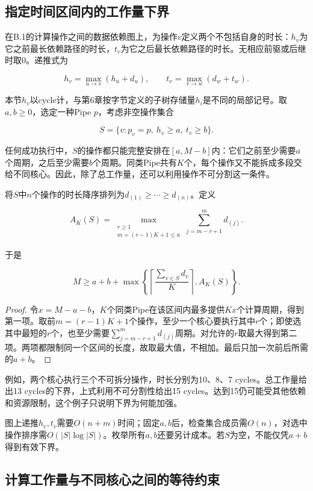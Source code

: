 \documentclass[anonymous,notoc]{gmcm2026}
\begin{document}
\subsection{指定时间区间内的工作量下界}

在B.1的计算操作之间的数据依赖图上，为操作\(v\)定义两个不包括自身的时长：\(h_v\)为它之前最长依赖路径的时长，\(t_v\)为它之后最长依赖路径的时长。无相应前驱或后继时取0。递推式为

\[h_v=\max_{u\to v}(h_u+d_u),\qquad t_v=\max_{v\to w}(d_w+t_w).\]

本节\(h_v\)以cycle计，与第6章按字节定义的子树存储量\(h_i\)是不同的局部记号。取\(a,b\ge0\)，选定一种Pipe \(p\)，考虑非空操作集合

\[S=\{v:p_v=p,\ h_v\ge a,\ t_v\ge b\}.\]

任何成功执行中，\(S\)的操作都只能完整安排在\([a,M-b]\)内：它们之前至少需要\(a\)个周期，之后至少需要\(b\)个周期。同类Pipe共有\(K\)个，每个操作又不能拆成多段交给不同核心。因此，除了总工作量，还可以利用操作不可分割这一条件。

将\(S\)中\(n\)个操作的时长降序排列为\(d_{(1)}\ge\cdots\ge d_{(n)}\)。定义

\[A_K(S)=\max_{\substack{r\ge1\\m=(r-1)K+1\le n}}\sum_{j=m-r+1}^{m}d_{(j)}.\]

于是

\[M\ge a+b+\max\left\{\left\lceil\frac{\sum_{v\in S}d_v}{K}\right\rceil,A_K(S)\right\}.\]

\begin{proof} 令\(x=M-a-b\)，\(K\)个同类Pipe在该区间内最多提供\(Kx\)个计算周期，得到第一项。取前\(m=(r-1)K+1\)个操作，至少一个核心要执行其中\(r\)个；即使选其中最短的\(r\)个，也至少需要\(\sum_{j=m-r+1}^{m}d_{(j)}\)周期。对允许的\(r\)取最大得到第二项。两项都限制同一个区间的长度，故取最大值，不相加。最后只加一次前后所需的\(a+b\)。\end{proof}

例如，两个核心执行三个不可拆分操作，时长分别为10、8、7 cycles。总工作量给出13 cycles的下界，上式利用不可分割性给出15 cycles。达到15仍可能受其他依赖和资源限制，这个例子只说明下界为何能加强。

图上递推\(h_v,t_v\)需要\(O(n+m)\)时间；固定\(a,b\)后，检查集合成员需\(O(n)\)，对选中操作排序需\(O(|S|\log|S|)\)。枚举所有\(a,b\)还要另计成本。若\(S\)为空，不能仅凭\(a+b\)得到有效下界。

\subsection{计算工作量与不同核心之间的等待约束}
\end{document}
